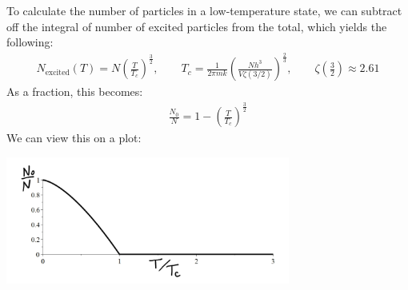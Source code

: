 \documentclass{article}
\begin{document}
To calculate the number of particles in a low-temperature state, we can subtract off the integral of number of excited particles from the total, which yields the following:
\begin{align*}
  N_\text{excited}(T) = N \left(\frac{T}{T_c}\right)^\frac{3}{2}, \qquad T_c = \frac{1}{2\pi mk} \left(\frac{Nh^3}{V \zeta(3/2)}\right)^\frac{2}{3}, \qquad \zeta \left(\frac{3}{2}\right) \approx 2.61
\end{align*}
As a fraction, this becomes:
\begin{align*}
  \frac{N_0}{N} = 1 - \left(\frac{T}{T_c}\right)^\frac{3}{2}
\end{align*}
We can view this on a plot:
\begin{center}
  \includegraphics[width=0.7\textwidth]{images/fermi_temp.png}
\end{center}
\end{document}
